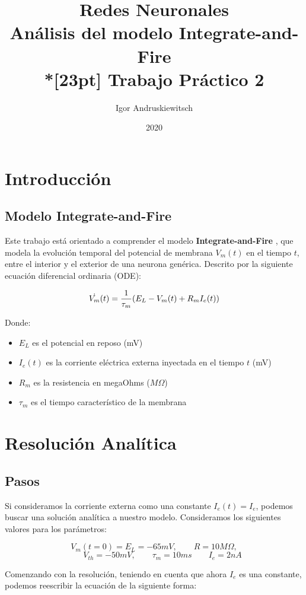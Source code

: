 \documentclass [a4paper,12pt,oneside,final]{article}
\title{%
Redes Neuronales \\
Análisis del modelo Integrate-and-Fire \\*[23pt]
Trabajo Práctico 2 \\
}
\date{2020}
\author{Igor Andruskiewitsch}
\begin{document}
    \maketitle

\section{Introducción}

\subsection{Modelo Integrate-and-Fire}

Este trabajo está orientado a comprender el modelo {\bf Integrate-and-Fire }, que modela la evolución temporal del potencial de membrana $ V_m(t) $ en el tiempo $ t $, entre el interior y el exterior de una neurona genérica. Descrito por la siguiente ecuación diferencial ordinaria (ODE):

\[ \dot{V_m}(t) = {1 \over \tau_m} (E_L - V_m(t) + R_m I_e(t)) \]

Donde:

\begin{itemize}
    \item {$ E_L $ es el potencial en reposo (mV) }
    \item {$ I_e(t) $ es la corriente eléctrica externa inyectada en el tiempo $ t $ (mV) }
    \item {$ R_m $ es la resistencia en megaOhms ($ M\Omega $) }
    \item {$ \tau_m $ es el tiempo característico de la membrana }
\end{itemize}

\section{Resolución Analítica}

\subsection{Pasos}

Si consideramos la corriente externa como una constante $ I_e(t) = I_e $, podemos buscar una solución analítica a nuestro modelo. Consideramos los siguientes valores para los parámetros:

\[ V_m(t = 0) = E_L = -65mV, \qquad R = 10 M \Omega, \]
\[ \qquad V_{th} = -50 mV, \qquad \tau_m = 10ms \qquad I_e = 2 nA \]

Comenzando con la resolución, teniendo en cuenta que ahora $ I_e $ es una constante, podemos reescribir la ecuación de la siguiente forma:
\end{document}
